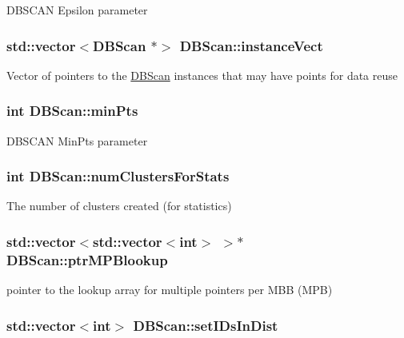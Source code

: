 D\-B\-S\-C\-A\-N Epsilon parameter \hypertarget{classDBScan_a8270fd572c31089b33fff1e047c00633}{
\subsubsection[{instance\-Vect}]{\setlength{\rightskip}{0pt plus 5cm}std\-::vector$<${\bf D\-B\-Scan} $\ast$$>$ D\-B\-Scan\-::instance\-Vect}}\label{classDBScan_a8270fd572c31089b33fff1e047c00633}
Vector of pointers to the \hyperlink{classDBScan}{D\-B\-Scan} instances that may have points for data reuse \hypertarget{classDBScan_ad117fc93029bcc699b919bb17e658292}{
\subsubsection[{min\-Pts}]{\setlength{\rightskip}{0pt plus 5cm}int D\-B\-Scan\-::min\-Pts\hspace{0.3cm}{\ttfamily [private]}}}\label{classDBScan_ad117fc93029bcc699b919bb17e658292}
D\-B\-S\-C\-A\-N Min\-Pts parameter \hypertarget{classDBScan_abf8ba9bc0c2b8ff8fab4c9d070f78ec7}{
\subsubsection[{num\-Clusters\-For\-Stats}]{\setlength{\rightskip}{0pt plus 5cm}int D\-B\-Scan\-::num\-Clusters\-For\-Stats}}\label{classDBScan_abf8ba9bc0c2b8ff8fab4c9d070f78ec7}
The number of clusters created (for statistics) \hypertarget{classDBScan_a4f4c2b033e9c3ec3bfb1cc43744e36a3}{
\subsubsection[{ptr\-M\-P\-Blookup}]{\setlength{\rightskip}{0pt plus 5cm}std\-::vector$<$std\-::vector$<$int$>$ $>$$\ast$ D\-B\-Scan\-::ptr\-M\-P\-Blookup\hspace{0.3cm}{\ttfamily [private]}}}\label{classDBScan_a4f4c2b033e9c3ec3bfb1cc43744e36a3}
pointer to the lookup array for multiple pointers per M\-B\-B (M\-P\-B) \hypertarget{classDBScan_affdefd0416bc3ba42ee2c069d8ac7eb3}{
\subsubsection[{set\-I\-Ds\-In\-Dist}]{\setlength{\rightskip}{0pt plus 5cm}std\-::vector$<$int$>$ D\-B\-Scan\-::set\-I\-Ds\-In\-Dist\hspace{0.3cm}{\ttfamily [private]}}}\label{classDBScan_affdefd0416bc3ba42ee2c069d8ac7eb3}
